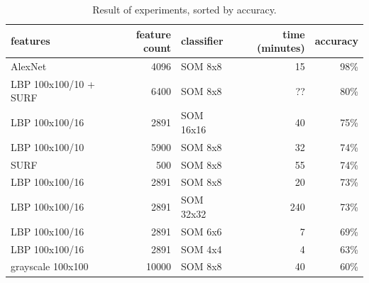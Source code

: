 \documentclass[doc/report.tex]{subfiles}
\begin{document}
\begin{table}[h]
    \centering
    \begin{tabular}{lrlrr}
        features & feature count & classifier & time (minutes) & accuracy \\\hline
        AlexNet & 4096 & SOM 8x8 & 15 & 98\% \\
        LBP 100x100/10 + SURF & 6400 & SOM 8x8 & ?? & 80\% \\
        LBP 100x100/16 & 2891 & SOM 16x16 & 40 & 75\% \\
        LBP 100x100/10 & 5900 & SOM 8x8 & 32 & 74\% \\
        SURF & 500 & SOM 8x8 & 55 & 74\% \\
        LBP 100x100/16 & 2891 & SOM 8x8 & 20 & 73\% \\
        LBP 100x100/16 & 2891 & SOM 32x32 & 240 & 73\% \\
        LBP 100x100/16 & 2891 & SOM 6x6 & 7 & 69\% \\
        LBP 100x100/16 & 2891 & SOM 4x4 & 4 & 63\% \\
        grayscale 100x100 & 10000 & SOM 8x8 & 40 & 60\% \\
    \end{tabular}%
    \caption{Result of experiments, sorted by accuracy.}
    \label{tbl:som}
\end{table}
\end{document}
